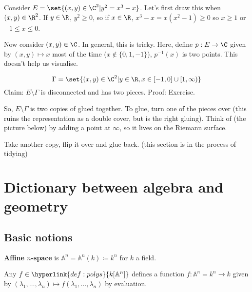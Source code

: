 \documentclass{article}
\newcommand{\A}{\mathbb{A}}
\begin{document}
\maketitle
\tableofcontents

Consider $E = \set{(x, y) \in \C^2 | y^2 = x^3 - x}$. Let's first draw this when $(x, y) \in \R^2$.
If $y \in \R$, $y^2 \geq 0$, so if $x \in \R$, $x^3 - x = x(x^2 - 1) \geq 0$ so $x \geq 1$ or $-1 \leq x \leq 0$.


Now consider $(x, y) \in \C$. In general, this is tricky.
Here, define $p: E \to \C$ given by $(x, y) \mapsto x$ most of the time ($x \notin \{0, 1, -1\}$), $p^{-1}(x)$ is two points.
This doesn't help us visualise.

\begin{equation*}
    \Gamma = \set{(x, y) \in \C^2 | y \in \R, x \in [-1, 0] \cup [1, \infty)}
\end{equation*}
Claim: $E \setminus \Gamma$ is disconnected and has two pieces.
Proof: Exercise.

So, $E \setminus \Gamma$ is two copies of
glued together. To glue, turn one of the pieces over (this ruins the representation as a double cover, but is the right gluing).
Think of (the picture below) by adding a point at $\infty$, so it lives on the Riemann surface.

Take another copy, flip it over and glue back.
(this section is in the process of tidying)

\clearpage
\section{Dictionary between algebra and geometry}
\subsection{Basic notions}
\begin{defi}\label{def:affineSpace}
    \textbf{Affine $n$-space} is $\A^n = \A^n(k) \coloneqq k^n$ for $k$ a field.
\end{defi}
Any $f \in \hyperlink{def:polys}{k[\A^n]}$ defines a function $f: \A^n =k^n \to k$ given by $(\lambda_1, \dotsc, \lambda_n) \mapsto f(\lambda_1, \dotsc, \lambda_n)$ by evaluation.
\end{document}
